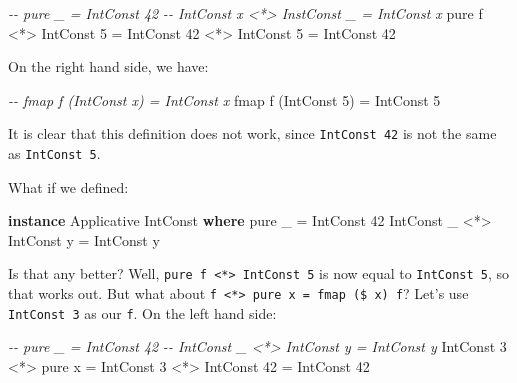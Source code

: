 \documentclass[]{article}
\newenvironment{Shaded}{}{}
\newcommand{\CommentTok}[1]{\textcolor[rgb]{0.38,0.63,0.69}{\textit{#1}}}
\newcommand{\DataTypeTok}[1]{\textcolor[rgb]{0.56,0.13,0.00}{#1}}
\newcommand{\DecValTok}[1]{\textcolor[rgb]{0.25,0.63,0.44}{#1}}
\newcommand{\FunctionTok}[1]{\textcolor[rgb]{0.02,0.16,0.49}{#1}}
\newcommand{\KeywordTok}[1]{\textcolor[rgb]{0.00,0.44,0.13}{\textbf{#1}}}
\newcommand{\NormalTok}[1]{#1}
\newcommand{\OperatorTok}[1]{\textcolor[rgb]{0.40,0.40,0.40}{#1}}
\newcommand{\OtherTok}[1]{\textcolor[rgb]{0.00,0.44,0.13}{#1}}
\begin{document}
\begin{Shaded}
\begin{Highlighting}[]
\CommentTok{{-}{-} pure \_                     = IntConst 42}
\CommentTok{{-}{-} IntConst x <*> InstConst \_ = IntConst x}
\FunctionTok{pure}\NormalTok{ f }\OperatorTok{<*>} \DataTypeTok{IntConst} \DecValTok{5} \OtherTok{=} \DataTypeTok{IntConst} \DecValTok{42} \OperatorTok{<*>} \DataTypeTok{IntConst} \DecValTok{5}
                      \OtherTok{=} \DataTypeTok{IntConst} \DecValTok{42}
\end{Highlighting}
\end{Shaded}

On the right hand side, we have:

\begin{Shaded}
\begin{Highlighting}[]
\CommentTok{{-}{-} fmap f (IntConst x) = IntConst x}
\FunctionTok{fmap}\NormalTok{ f (}\DataTypeTok{IntConst} \DecValTok{5}\NormalTok{) }\OtherTok{=} \DataTypeTok{IntConst} \DecValTok{5}
\end{Highlighting}
\end{Shaded}

It is clear that this definition does not work, since \texttt{IntConst\ 42} is
not the same as \texttt{IntConst\ 5}.

What if we defined:

\begin{Shaded}
\begin{Highlighting}[]
\KeywordTok{instance} \DataTypeTok{Applicative} \DataTypeTok{IntConst} \KeywordTok{where}
    \FunctionTok{pure}\NormalTok{ \_                    }\OtherTok{=} \DataTypeTok{IntConst} \DecValTok{42}
    \DataTypeTok{IntConst}\NormalTok{ \_ }\OperatorTok{<*>} \DataTypeTok{IntConst}\NormalTok{ y }\OtherTok{=} \DataTypeTok{IntConst}\NormalTok{ y}
\end{Highlighting}
\end{Shaded}

Is that any better? Well,
\texttt{pure\ f\ \textless{}*\textgreater{}\ IntConst\ 5} is now equal to
\texttt{IntConst\ 5}, so that works out. But what about
\texttt{f\ \textless{}*\textgreater{}\ pure\ x\ =\ fmap\ (\$\ x)\ f}? Let's use
\texttt{IntConst\ 3} as our \texttt{f}. On the left hand side:

\begin{Shaded}
\begin{Highlighting}[]
\CommentTok{{-}{-} pure \_                    = IntConst 42}
\CommentTok{{-}{-} IntConst \_ <*> IntConst y = IntConst y}
\DataTypeTok{IntConst} \DecValTok{3} \OperatorTok{<*>} \FunctionTok{pure}\NormalTok{ x }\OtherTok{=} \DataTypeTok{IntConst} \DecValTok{3} \OperatorTok{<*>} \DataTypeTok{IntConst} \DecValTok{42}
                      \OtherTok{=} \DataTypeTok{IntConst} \DecValTok{42}
\end{Highlighting}
\end{Shaded}
\end{document}
